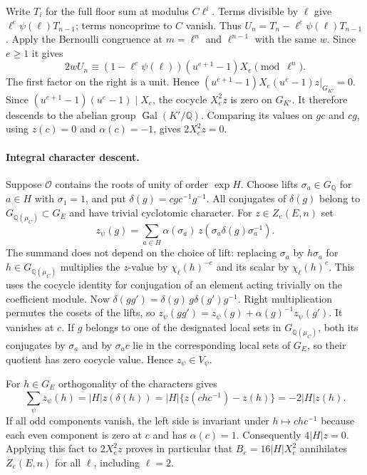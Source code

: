 Write $T_i$ for the full floor sum at modulus $C\ell^i$. Terms divisible
by $\ell$ give $\ell^e\psi(\ell)T_{n-1}$; terms noncoprime to $C$ vanish.
Thus $U_n=T_n-\ell^e\psi(\ell)T_{n-1}$. Apply the Bernoulli congruence
at $m=\ell^n$ and $\ell^{n-1}$ with the same $w$. Since $e\ge1$ it gives
\[
 2wU_n\equiv(1-\ell^e\psi(\ell))(u^{e+1}-1)X_e\pmod{\ell^n}.
\]
The first factor on the right is a unit. Hence
$(u^{e+1}-1)X_e(u^e-1)z|_{G_{K'}}=0$. Since
$(u^{e+1}-1)(u^e-1)\mid X_e$, the cocycle $X_e^2 z$ is zero
on $G_{K'}$. It therefore descends to the abelian group
$\operatorname{Gal}(K'/\mathbb Q)$. Comparing its values on $gc$ and
$cg$, using $z(c)=0$ and $\alpha(c)=-1$, gives $2 X_e^2z=0$.

\paragraph{Integral character descent.}
Suppose $\mathcal O$ contains the roots of unity of order
$\exp H$. Choose lifts $\sigma_a\in G_{\mathbb Q}$ for $a\in H$ with
$\sigma_1=1$, and put $\delta(g)=cgc^{-1}g^{-1}$. All conjugates
of $\delta(g)$ belong to $G_{\mathbb Q(\mu_C)}\subset G_E$ and have
trivial cyclotomic character. For $z\in Z_e(E,n)$ set
\[
 z_\psi(g)=\sum_{a\in H}\alpha(\sigma_a)\,
       z(\sigma_a\delta(g)\sigma_a^{-1}).
\]
The summand does not depend on the choice of lift: replacing $\sigma_a$
by $h\sigma_a$ for $h\in G_{\mathbb Q(\mu_C)}$ multiplies the $z$-value
by $\chi_\ell(h)^{-e}$ and its scalar by $\chi_\ell(h)^e$.
This uses the cocycle identity for conjugation of an element acting
trivially on the coefficient module. Now
$\delta(gg')=\delta(g)\,g\delta(g')g^{-1}$.
Right multiplication permutes the cosets of the lifts, so
$z_\psi(gg')=z_\psi(g)+\alpha(g)^{-1}z_\psi(g')$.
It vanishes at $c$. If $g$ belongs to one of the designated local
sets in $G_{\mathbb Q(\mu_C)}$, both its conjugates by $\sigma_a$
and by $\sigma_a c$ lie in the corresponding local sets of $G_E$,
so their quotient has zero cocycle value. Hence $z_\psi\in V_\psi$.

For $h\in G_E$ orthogonality of the characters gives
\[
 \sum_\psi z_\psi(h)=|H|z(\delta(h))
              =|H|\{z(chc^{-1})-z(h)\}=-2|H|z(h).
\]
If all odd components vanish, the left side is invariant under
$h\mapsto chc^{-1}$ because each even component is zero at $c$ and
has $\alpha(c)=1$. Consequently $4|H|z=0$.
Applying this fact to $2X_e^2 z$ proves in particular that $B_e=16|H|X_e^2$
annihilates $Z_e(E,n)$ for all $\ell$, including $\ell=2$.

